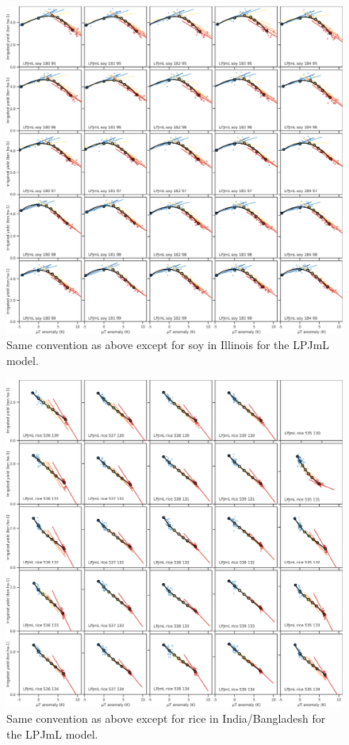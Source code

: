 \documentclass[10pt]{article}
\begin{document}
\begin{figure}[h!]
\centering
\includegraphics[width=\textwidth]{tempyearvclim_soy_LPJmL.png}
\caption{Same convention as above except for soy in Illinois for the LPJmL model.}
\label{fig:lpjmlsoy}
\end{figure}

\begin{figure}[h!]
\centering
\includegraphics[width=\textwidth]{tempyearvclim_rice_LPJmL.png}
\caption{Same convention as above except for rice in India/Bangladesh for the LPJmL model.}
\label{fig:lpjmlrice}
\end{figure}
\end{document}
